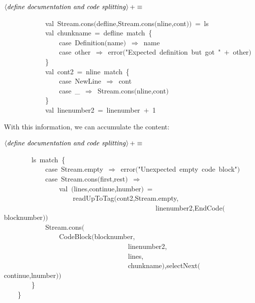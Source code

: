 \documentclass[a4paper,12pt]{article}
\begin{document}
$\left<\mbox{\emph{define documentation and code splitting}}\right>+\equiv$
\begin{program}~~~~~~~~~~~~{\vem val}~Stream.cons$($defline,Stream.cons$($nline,cont$)$$)$~=~ls
\\~~~~~~~~~~~~{\vem val}~chunkname~=~defline~{\vem match}~{\small\{}
\\~~~~~~~~~~~~~~~~{\vem case}~Definition$($name$)$~$\Rightarrow$~name
\\~~~~~~~~~~~~~~~~{\vem case}~other~$\Rightarrow$~error$($"Expected~definition~but~got~"~$+$~other$)$
\\~~~~~~~~~~~~{\small\}}
\\~~~~~~~~~~~~{\vem val}~cont2~=~nline~{\vem match}~{\small\{}
\\~~~~~~~~~~~~~~~~{\vem case}~NewLine~$\Rightarrow$~cont
\\~~~~~~~~~~~~~~~~{\vem case}~\_~$\Rightarrow$~Stream.cons$($nline,cont$)$
\\~~~~~~~~~~~~{\small\}}
\\~~~~~~~~~~~~{\vem val}~linenumber2~=~linenumber~$+$~1
\\[0.5em]\end{program}


 With this information, we can accumulate the content:

$\left<\mbox{\emph{define documentation and code splitting}}\right>+\equiv$
\begin{program}~~~~~~~~ls~{\vem match}~{\small\{}
\\~~~~~~~~~~~~{\vem case}~Stream.empty~$\Rightarrow$~error$($"Unexpected~empty~code~block"$)$
\\~~~~~~~~~~~~{\vem case}~Stream.cons$($first,rest$)$~$\Rightarrow$
\\~~~~~~~~~~~~~~~~{\vem val}~$($lines,continue,lnumber$)$~=
\\~~~~~~~~~~~~~~~~~~~~readUpToTag$($cont2,Stream.empty,
\\~~~~~~~~~~~~~~~~~~~~~~~~~~~~~~~~~~~~~~~~~~~~linenumber2,EndCode$($blocknumber$)$$)$
\\[0.5em]~~~~~~~~~~~~Stream.cons$($
\\~~~~~~~~~~~~~~~~CodeBlock$($blocknumber,
\\~~~~~~~~~~~~~~~~~~~~~~~~~~~~~~~~~~~~linenumber2,
\\~~~~~~~~~~~~~~~~~~~~~~~~~~~~~~~~~~~~lines,
\\~~~~~~~~~~~~~~~~~~~~~~~~~~~~~~~~~~~~chunkname$)$,selectNext$($continue,lnumber$)$$)$
\\~~~~~~~~{\small\}}
\\~~~~{\small\}}
\\[0.5em]\end{program}
\end{document}
